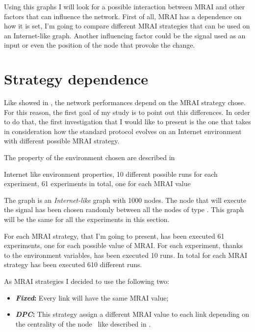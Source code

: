 Using this graphs I will look for a possible interaction between \ac{MRAI} and other
factors that can influence the network.
First of all, \ac{MRAI} has a dependence on how it is set, I'm going to compare
different \ac{MRAI} strategies that can be used on an Internet-like graph.
Another influencing factor could be the signal used as an input or even the position
of the node that provoke the change.

\section{Strategy dependence}
\label{sec:bgp_mrai_strategy_dependance}

Like showed in , the network performances depend
on the \ac{MRAI} strategy chose.
For this reason, the first goal of my study is to point out this differences.
In order to do that, the first investigation that I would like to present is the one
that takes in consideration how the standard protocol evolves on an Internet environment
with different possible \ac{MRAI} strategy.

The property of the environment chosen are described in 

\begin{table}[h]
	
		\caption{Internet like environment properties, \num{10} different possible
		runs for each experiment, \num{61} experiments in total, one for each
		\ac{MRAI} value}
	\label{tbl:internet_like_properties}
\end{table}

The graph is an \textit{Internet-like} graph with \num{1000} nodes.
The node that will execute the signal has been chosen randomly between
all the nodes of type .
This graph will be the same for all the experiments in this section.

For each \ac{MRAI} strategy, that I'm going to present, has been executed \num{61}
experiments, one for each possible value of \ac{MRAI}.
For each experiment, thanks to the environment variables, has been executed \num{10} runs.
In total for each \ac{MRAI} strategy has been executed \num{610} different runs.

As \ac{MRAI} strategies I decided to use the following two:
\begin{itemize}
	\item \textbf{\textit{Fixed}:} Every link will have the same
		\ac{MRAI} value;
	\item \textbf{\textit{DPC}:} This strategy assign a different
		\ac{MRAI} value to each link depending on the centrality of the node~\cite{milani2020improving}
		like described in .
\end{itemize}

